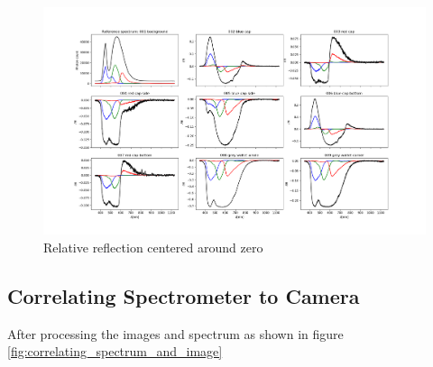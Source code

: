 \begin{landscape}
\begin{figure}[t]
    \centering
    \includegraphics[width=1\paperwidth]{Plots/relative_reflectance_around_zero_with_qe_color_response.png}
    \caption{Relative reflection centered around zero}
    \label{fig:relative_reflection_around_zero}
\end{figure}
\end{landscape}


\subsection{Correlating Spectrometer to Camera}

After processing the images and spectrum as shown in figure \ref{fig:correlating_spectrum_and_image} 
